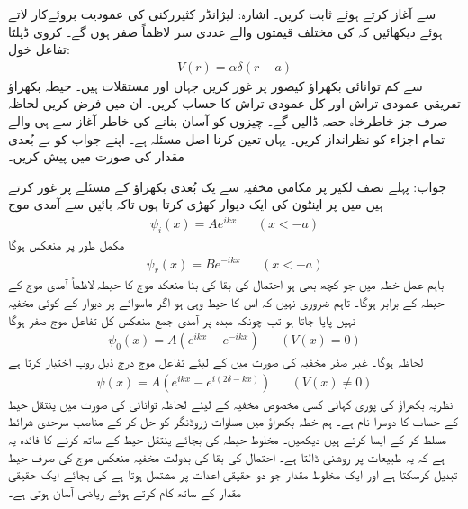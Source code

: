 \documentclass[leqno, b5paper]{khalid-urdu-book}
\begin{document}
 سے آغاز کرتے ہوئے  ثابت کریں۔ اشارہ: لیژانڈر کثیررکنی کی عمودیت بروئےکار لاتے ہوئے دیکھائیں کہ  کی مختلف قیمتوں والے عددی سر لاظماً صفر ہوں گے۔
کروی ڈیلٹا تفاعل خول:
\begin{align*}
	V(r) = \alpha\delta(r-a)
\end{align*}
سے کم توانائی بکھراؤ کیصور پر غور کریں جہاں  اور  مستقلات ہیں۔ حیطہ بکھراؤ  تفریقی عمودی تراش  اور کل عمودی تراش  کا حساب کریں۔ ان میں  فرض کریں لحاظہ صرف  جز خاطرخاہ حصہ ڈالیں گے۔ چیزوں کو آسان بنانے کی خاطر آغاز سے ہی  والے تمام اجزاء کو نظرانداز کریں۔ یہاں  تعین کرنا اصل مسئلہ ہے۔ اپنے جواب کو بے بُعدی مقدار  کی صورت میں پیش کریں۔

جواب: 	
پہلے نصف لکیر  پر مکامی مخفیہ  سے یک بُعدی بکھراؤ کے مسئلے پر غور کرتے ہیں  میں  پر اینٹون کی ایک دیوار کھڑی کرتا ہوں تاکہ بائیں سے آمدی موج 
\begin{align}
	\psi_i(x) = Ae^{ikx}&&(x<-a)
\end{align}
مکمل طور پر منعکس ہوگا
\begin{align}
	\psi_r(x) = Be^{-ikx}&&(x<-a)
\end{align}
باہم عمل خطہ  میں جو کچھ بھی ہو احتمال کی بقا کی بنا منعکد موج کا حیطہ لاظماً آمدی موج کے حیطہ کے برابر ہوگا۔ تاہم ضروری نہیں کہ اس کا حیط وہی ہو اگر ماسوائے  پر دیوار کے کوئی مخفیہ نہیں پایا جاتا ہو تب چونکہ مبدہ پر آمدی جمع منعکس کل تفاعل موج صفر ہوگا 
\begin{align}
	\psi_0(x) = A\left(e^{ikx}-e^{-ikx}\right)&&(V(x)=0)
\end{align}
لحاظہ  ہوگا۔ غیر صفر مخفیہ کی صورت میں  کے لیئے تفاعل موج درج ذیل روپ اختیار کرتا ہے
\begin{align}
	\psi(x) = A\left(e^{ikx}-e^{i(2\delta-kx)}\right)&&(V(x)\neq0)
\end{align}
نظریہ بکھراؤ کی پوری کہانی کسی مخصوص مخفیہ کے لیئے  لحاظہ توانائی  کی صورت میں ینتقل حیط کے حساب کا دوسرا نام ہے۔ ہم خطہ بکھراؤ  میں مساوات زروڈنگر کو حل کر کے مناصب سرحدی شرائط مسلط کر کے ایسا کرتے ہیں  دیکھیں۔ مخلوط حیطہ  کی بجائے ینتقل حیط کے ساتھ کرنے کا فائدہ یہ ہے کہ یہ طبیعات پر روشنی ڈالتا ہے۔ احتمال کی بقا کی بدولت مخفیہ منعکس موج کی صرف حیط تبدیل کرسکتا ہے اور ایک مخلوط مقدار جو دو حقیقی اعدات پر مشتمل ہوتا ہے کی بجائے ایک حقیقی مقدار کے ساتھ کام کرتے ہوئے ریاضی آسان ہوتی ہے۔
\end{document}
